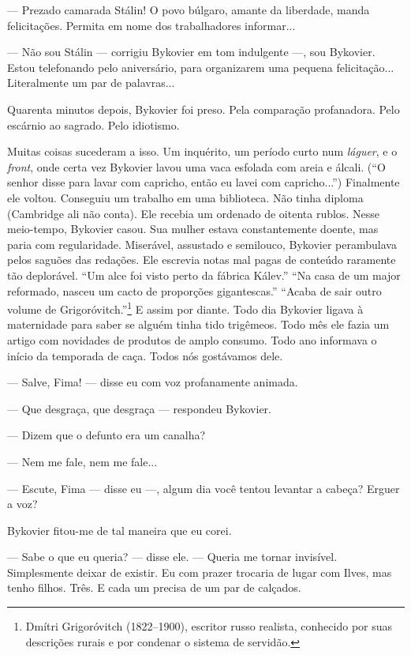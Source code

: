 --- Prezado camarada Stálin! O povo búlgaro, amante da liberdade, manda
felicitações. Permita em nome dos trabalhadores informar...

--- Não sou Stálin --- corrigiu Bykovier em tom indulgente ---, sou
Bykovier. Estou telefonando pelo aniversário, para organizarem uma
pequena felicitação... Literalmente um par de palavras...

Quarenta minutos depois, Bykovier foi preso. Pela comparação
profanadora. Pelo escárnio ao sagrado. Pelo idiotismo.

Muitas coisas sucederam a isso. Um inquérito, um período curto num
\emph{láguer}, e o \emph{front}, onde certa vez Bykovier lavou uma vaca
esfolada com areia e álcali. (``O senhor disse para lavar com capricho,
então eu lavei com capricho...'') Finalmente ele voltou. Conseguiu um
trabalho em uma biblioteca. Não tinha diploma (Cambridge ali não conta).
Ele recebia um ordenado de oitenta rublos. Nesse meio-tempo, Bykovier
casou. Sua mulher estava constantemente doente, mas paria com
regularidade. Miserável, assustado e semilouco, Bykovier perambulava
pelos saguões das redações. Ele escrevia notas mal pagas de conteúdo
raramente tão deplorável. ``Um alce foi visto perto da fábrica Kálev.''
``Na casa de um major reformado, nasceu um cacto de proporções
gigantescas.'' ``Acaba de sair outro volume de Grigoróvitch.''\footnote{Dmítri
  Grigoróvitch (1822--1900), escritor russo realista, conhecido por suas
  descrições rurais e por condenar o sistema de servidão.} E assim por
diante. Todo dia Bykovier ligava à maternidade para saber se alguém
tinha tido trigêmeos. Todo mês ele fazia um artigo com novidades de
produtos de amplo consumo. Todo ano informava o início da temporada de
caça. Todos nós gostávamos dele.

--- Salve, Fima! --- disse eu com voz profanamente animada.

--- Que desgraça, que desgraça --- respondeu Bykovier.

--- Dizem que o defunto era um canalha?

--- Nem me fale, nem me fale...

--- Escute, Fima --- disse eu ---, algum dia você tentou levantar a
cabeça? Erguer a voz?

Bykovier fitou-me de tal maneira que eu corei.

--- Sabe o que eu queria? --- disse ele. --- Queria me tornar invisível.
Simplesmente deixar de existir. Eu com prazer trocaria de lugar com
Ilves, mas tenho filhos. Três. E cada um precisa de um par de calçados.

